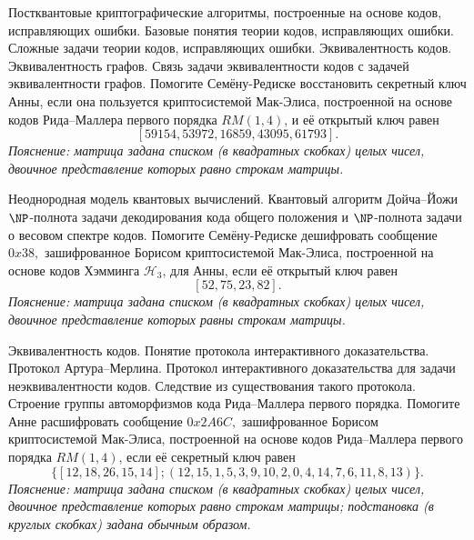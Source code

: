 \begin{questions}
    \question
        Постквантовые криптографические алгоритмы, построенные на основе кодов, исправляющих ошибки.
        Базовые понятия теории кодов, исправляющих ошибки.
        Сложные задачи теории кодов, исправляющих ошибки.
    \question
        Эквивалентность кодов.
        Эквивалентность графов.
        Связь задачи эквивалентности кодов с задачей эквивалентности графов.
    \question
        Помогите Семёну-Редиске восстановить секретный ключ Анны, если она пользуется криптосистемой Мак-Элиса, построенной на основе кодов Рида--Маллера первого порядка \(RM(1, 4)\), и её открытый ключ равен 
        \[[59154, 53972, 16859, 43095, 61793].\]
        \emph{Пояснение: матрица задана списком (в квадратных скобках) целых чисел, двоичное представление которых равно строкам матрицы.}

\end{questions}


\begin{questions}
    \question
        Неоднородная модель квантовых вычислений. Квантовый алгоритм Дойча--Йожи
    \question
        \(\NP\)-полнота задачи декодирования кода общего положения и \(\NP\)-полнота задачи о весовом спектре кодов.
    \question
        Помогите Семёну-Редиске дешифровать сообщение \(0x38,\) зашифрованное Борисом криптосистемой Мак-Элиса, построенной на основе кодов Хэмминга \(\mathcal{H}_3\), для Анны, если её открытый ключ равен 
        \[[52, 75, 23, 82].\]
        \emph{Пояснение: матрица задана списком (в квадратных скобках) целых чисел, двоичное представление которых равны строкам матрицы.}
\end{questions}


\begin{questions}
    \question
        Эквивалентность кодов.
        Понятие протокола интерактивного доказательства.
        Протокол Артура--Мерлина.
        Протокол интерактивного доказательства для задачи неэквивалентности кодов.
        Следствие из существования такого протокола.
    \question
        Строение группы автоморфизмов кода Рида--Маллера первого порядка.
    \question
        Помогите Анне расшифровать сообщение \(0x2A6C,\) зашифрованное Борисом криптосистемой Мак-Элиса, построенной на основе кодов Рида--Маллера первого порядка \(RM(1,4)\), если её секретный ключ равен \[\{[12, 18, 26, 15, 14]; (12, 15, 1, 5, 3, 9, 10, 2, 0, 4, 14, 7, 6, 11, 8, 13)\}.\]
        \emph{Пояснение: матрица задана списком (в квадратных скобках) целых чисел, двоичное представление которых равно строкам матрицы; подстановка (в круглых скобках) задана обычным образом.}
\end{questions}




